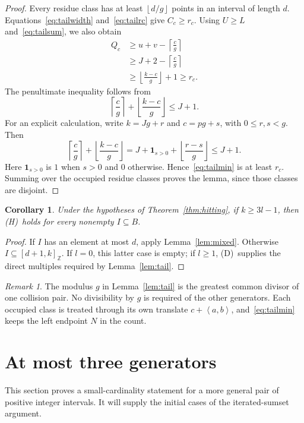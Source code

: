 \documentclass[11pt,a4paper]{article}
\numberwithin{equation}{section}
\newtheorem{corollary}[theorem]{Corollary}
\theoremstyle{remark}
\newtheorem{remark}[theorem]{Remark}
\newcommand{\Z}{\mathbb Z}
\newcommand{\sg}[1]{\left\langle #1\right\rangle}
\newcommand{\floor}[1]{\left\lfloor #1\right\rfloor}
\newcommand{\ceil}[1]{\left\lceil #1\right\rceil}
\newcommand{\Dcond}{\textup{(D)}}
\newcommand{\Hcond}{\textup{(H)}}
\newcommand{\interval}[2]{[#1,#2]_{\Z}}
\begin{document}
\begin{proof}
Every residue class has at least $\floor{d/g}$ points in an interval
of length $d$. Equations~\eqref{eq:tailwidth} and~\eqref{eq:tailrc}
give $C_c\ge r_c$.
Using $U\ge L$ and~\eqref{eq:tailsum}, we also obtain
\begin{equation}\label{eq:tailQbound}
  \begin{split}
  Q_c
  &\ge u+v-\ceil{\frac{c}{g}}\\
  &\ge J+2-\ceil{\frac{c}{g}}\\
  &\ge \floor{\frac{k-c}{g}}+1
   \ge r_c.
  \end{split}
\end{equation}
The penultimate inequality follows from
\[
  \ceil{\frac{c}{g}}+\floor{\frac{k-c}{g}}\le J+1.
\]
For an explicit calculation, write $k=Jg+r$ and $c=pg+s$, with
$0\le r,s<g$. Then
\[
  \ceil{\frac{c}{g}}+\floor{\frac{k-c}{g}}
  =J+\mathbf{1}_{s>0}+\floor{\frac{r-s}{g}}\le J+1.
\]
Here $\mathbf{1}_{s>0}$ is $1$ when $s>0$ and $0$ otherwise.
Hence~\eqref{eq:tailmin} is at least $r_c$.
Summing over the occupied residue classes proves the lemma, since those
classes are disjoint.
\end{proof}

\begin{corollary}\label{cor:tailrange}
Under the hypotheses of Theorem~\ref{thm:hitting}, if $k\ge3l-1$,
then \Hcond\ holds for every nonempty $I\subseteq B$.
\end{corollary}

\begin{proof}
If $I$ has an element at most $d$, apply Lemma~\ref{lem:mixed}.
Otherwise $I\subseteq\interval{d+1}{k}$.
If $l=0$, this latter case is empty; if $l\ge1$, \Dcond\ supplies the
direct multiples required by Lemma~\ref{lem:tail}.
\end{proof}

\begin{remark}
The modulus $g$ in Lemma~\ref{lem:tail} is the greatest common divisor
of one collision pair. No divisibility by $g$ is required of the other
generators. Each occupied class is treated through its own translate
$c+\sg{a,b}$, and~\eqref{eq:tailmin} keeps the left endpoint $N$
in the count.
\end{remark}

\section{At most three generators}\label{sec:three}

This section proves a small-cardinality statement for a more general
pair of positive integer intervals. It will supply the initial cases
of the iterated-sumset argument.
\end{document}
